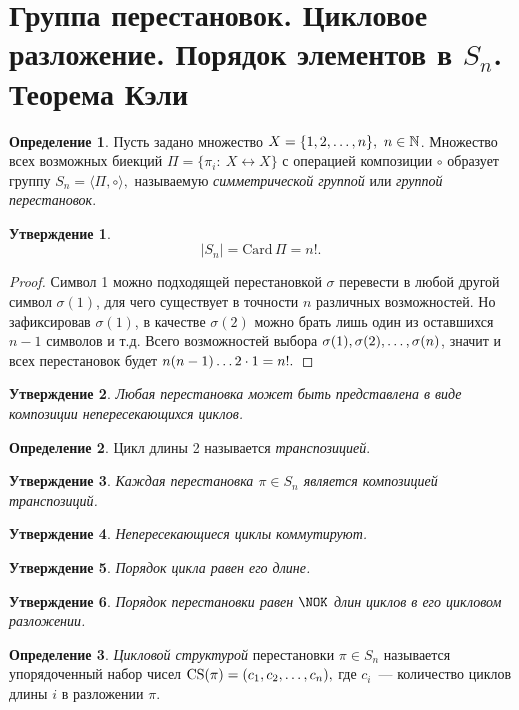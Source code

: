 \documentclass[a4paper, 14pt]{extarticle}
\newcommand{\naturals}{\mathbb{N}}
\newcommand{\CS}{\mathrm{CS}}
\theoremstyle{definition}
\newtheorem{definition}{Определение}
\theoremstyle{plain}
\numberwithin{theorem}{section}
\numberwithin{definition}{section}
\newtheorem{statement}{Утверждение}
\numberwithin{statement}{section}
\numberwithin{lemma}{section}
\numberwithin{consequence}{section}
\begin{document}
	\section{Группа перестановок. Цикловое разложение. Порядок элементов в $S_n$. Теорема Кэли}
	\setcounter{definition}{0}
	\begin{definition}
		Пусть задано множество ${X = \{1, 2, \mathellipsis, n\}, \ n \in \naturals}$. Множество всех возможных биекций ${\Pi =\{\pi_i{:} \ X \leftrightarrow X\}}$ с операцией композиции $\circ$ образует группу ${S_n = \langle \Pi, \circ \rangle,}$ называемую \textit{симметрической группой} или \textit{группой перестановок}.
	\end{definition}
	\begin{statement}
		\begin{equation*}
			|S_n| = \mathrm{Card} \, \Pi = n!.
		\end{equation*}
	\end{statement}
	\begin{proof}
		Символ 1 можно подходящей перестановкой $\sigma$ перевести в любой другой символ ${\sigma(1)}$, для чего существует в точности $n$ различных возможностей. Но зафиксировав ${\sigma(1)}$, в качестве ${\sigma(2)}$ можно брать лишь один из оставшихся ${n - 1}$ символов и т.д. Всего возможностей выбора ${\sigma(1), \sigma(2), \mathellipsis, \sigma(n)}$, значит и всех перестановок будет ${n(n - 1) \mathellipsis 2 \cdot 1 = n!.}$
	\end{proof}
	\begin{statement}
		Любая перестановка может быть представлена в виде композиции непересекающихся циклов.
	\end{statement}
	\begin{definition}
		Цикл длины 2 называется \textit{транспозицией}.
	\end{definition}
	\begin{statement}
		Каждая перестановка ${\pi \in S_n}$ является композицией транспозиций.
	\end{statement}
	\begin{statement}
		Непересекающиеся циклы коммутируют.
	\end{statement}
	\begin{statement}
		Порядок цикла равен его длине.
	\end{statement}
	\begin{statement}
		Порядок перестановки равен $\NOK$ длин циклов в его цикловом разложении.
	\end{statement}
	\begin{definition}
		\textit{Цикловой структурой} перестановки ${\pi \in S_n}$ называется упорядоченный набор чисел ${\CS(\pi) = (c_1, c_2, \mathellipsis, c_n),}$ где $c_i$~--- количество циклов длины $i$ в разложении $\pi.$
	\end{definition}
\end{document}
